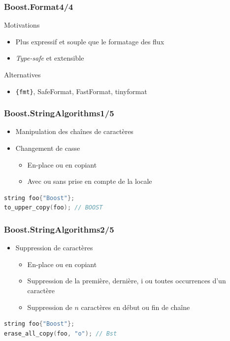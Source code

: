 \documentclass[C++.tex]{subfiles}
\begin{document}
\begin{frame}[fragile]
	\frametitle{Boost.Format\titlehfill{}4/4}
	\begin{block}{Motivations}
		\begin{itemize}
			\item Plus expressif et souple que le formatage des flux
			\item \textit{Type-safe} et extensible
		\end{itemize}
	\end{block}

	\begin{block}{Alternatives}
		\begin{itemize}
			\item \lstinline|{fmt}|, SafeFormat, FastFormat,  tinyformat
		\end{itemize}
	\end{block}
\end{frame}

\begin{frame}[fragile]
	\frametitle{Boost.StringAlgorithms\titlehfill{}1/5}
	\begin{itemize}
		\item Manipulation des chaînes de caractères
		\item Changement de casse
		\begin{itemize}
			\item En-place ou en copiant
			\item Avec ou sans prise en compte de la locale
		\end{itemize}
	\end{itemize}

	\begin{lstlisting}[language=C++]
string foo{"Boost"};
to_upper_copy(foo); // BOOST\end{lstlisting}
\end{frame}

\begin{frame}[fragile]
	\frametitle{Boost.StringAlgorithms\titlehfill{}2/5}
	\begin{itemize}
		\item Suppression de caractères
		\begin{itemize}
			\item En-place ou en copiant
			\item Suppression de la première, dernière, i\ieme{} ou toutes occurrences d'un caractère
			\item Suppression de $n$ caractères en début ou fin de chaîne
		\end{itemize}
	\end{itemize}

	\begin{lstlisting}[language=C++]
string foo{"Boost"};
erase_all_copy(foo, "o"); // Bst\end{lstlisting}
\end{frame}
\end{document}
